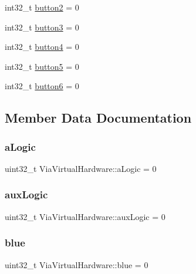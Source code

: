 \begin{DoxyCompactItemize}
int32\+\_\+t \mbox{\hyperlink{class_via_virtual_hardware_a109d193142620b32473c10fd8f5b0f38}{button2}} = 0
\item 
int32\+\_\+t \mbox{\hyperlink{class_via_virtual_hardware_a44103ea6b0bf0e5fd3259a374e2d9a42}{button3}} = 0
\item 
int32\+\_\+t \mbox{\hyperlink{class_via_virtual_hardware_aaa62a1d400287470eb681e005f470cdd}{button4}} = 0
\item 
int32\+\_\+t \mbox{\hyperlink{class_via_virtual_hardware_a0816f2206478d154e5d6636215ebc2c8}{button5}} = 0
\item 
int32\+\_\+t \mbox{\hyperlink{class_via_virtual_hardware_a519f07664499afdfd1d5c8d65e37e117}{button6}} = 0
\end{DoxyCompactItemize}


\subsection{Member Data Documentation}
\mbox{\label{class_via_virtual_hardware_a51d26b9473292528dfee51ab9a5709c0}} 
\subsubsection{\texorpdfstring{a\+Logic}{aLogic}}
{\footnotesize\ttfamily uint32\+\_\+t Via\+Virtual\+Hardware\+::a\+Logic = 0}

\mbox{\label{class_via_virtual_hardware_aebf9a3ff013d113a2b0b65281d72d305}} 
\subsubsection{\texorpdfstring{aux\+Logic}{auxLogic}}
{\footnotesize\ttfamily uint32\+\_\+t Via\+Virtual\+Hardware\+::aux\+Logic = 0}

\mbox{\label{class_via_virtual_hardware_ada4bc4838ea9308df984a9534f87e575}} 
\subsubsection{\texorpdfstring{blue}{blue}}
{\footnotesize\ttfamily uint32\+\_\+t Via\+Virtual\+Hardware\+::blue = 0}

